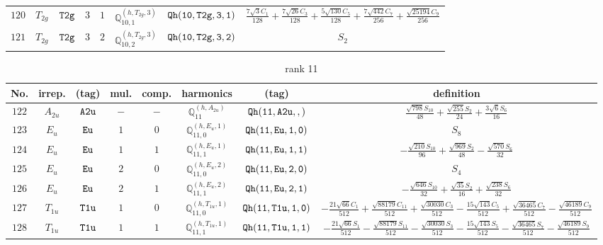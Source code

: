 \documentclass[fleqn,8pt]{jsarticle}
\begin{document}
\begin{table}[ht!]
\begin{center}
\begin{tabular}{cccccccc}
$ 120 $ & $ T_{2g} $ & $ {\tt T2g} $ & $ 3 $ & $ 1 $ & $ \mathbb{Q}_{10,1}^{(h,T_{2g},3)} $ & $ {\tt Qh(10,T2g,3,1)} $ & $ \frac{7 \sqrt{3} C_{1}}{128} + \frac{7 \sqrt{26} C_{3}}{128} + \frac{5 \sqrt{130} C_{5}}{128} + \frac{7 \sqrt{442} C_{7}}{256} + \frac{\sqrt{25194} C_{9}}{256} $ \\
$ 121 $ & $ T_{2g} $ & $ {\tt T2g} $ & $ 3 $ & $ 2 $ & $ \mathbb{Q}_{10,2}^{(h,T_{2g},3)} $ & $ {\tt Qh(10,T2g,3,2)} $ & $ S_{2} $ \\
 \hline \hline
\end{tabular}
\end{center}
\end{table}
\begin{table}[ht!]
\begin{center}
\caption{rank 11}
\renewcommand{\arraystretch}{1.3}
\begin{tabular}{cccccccc} \hline \hline
No. & irrep. & (tag) & mul. & comp. & harmonics & (tag) & definition \\ \hline
$ 122 $ & $ A_{2u} $ & $ {\tt A2u} $ & $ - $ & $ - $ & $ \mathbb{Q}_{11}^{(h,A_{2u})} $ & $ {\tt Qh(11,A2u,,)} $ & $ \frac{\sqrt{798} S_{10}}{48} + \frac{\sqrt{255} S_{2}}{24} + \frac{3 \sqrt{6} S_{6}}{16} $ \\
$ 123 $ & $ E_{u} $ & $ {\tt Eu} $ & $ 1 $ & $ 0 $ & $ \mathbb{Q}_{11,0}^{(h,E_{u},1)} $ & $ {\tt Qh(11,Eu,1,0)} $ & $ S_{8} $ \\
$ 124 $ & $ E_{u} $ & $ {\tt Eu} $ & $ 1 $ & $ 1 $ & $ \mathbb{Q}_{11,1}^{(h,E_{u},1)} $ & $ {\tt Qh(11,Eu,1,1)} $ & $ - \frac{\sqrt{210} S_{10}}{96} + \frac{\sqrt{969} S_{2}}{48} - \frac{\sqrt{570} S_{6}}{32} $ \\
$ 125 $ & $ E_{u} $ & $ {\tt Eu} $ & $ 2 $ & $ 0 $ & $ \mathbb{Q}_{11,0}^{(h,E_{u},2)} $ & $ {\tt Qh(11,Eu,2,0)} $ & $ S_{4} $ \\
$ 126 $ & $ E_{u} $ & $ {\tt Eu} $ & $ 2 $ & $ 1 $ & $ \mathbb{Q}_{11,1}^{(h,E_{u},2)} $ & $ {\tt Qh(11,Eu,2,1)} $ & $ - \frac{\sqrt{646} S_{10}}{32} + \frac{\sqrt{35} S_{2}}{16} + \frac{\sqrt{238} S_{6}}{32} $ \\
$ 127 $ & $ T_{1u} $ & $ {\tt T1u} $ & $ 1 $ & $ 0 $ & $ \mathbb{Q}_{11,0}^{(h,T_{1u},1)} $ & $ {\tt Qh(11,T1u,1,0)} $ & $ - \frac{21 \sqrt{66} C_{1}}{512} + \frac{\sqrt{88179} C_{11}}{512} + \frac{\sqrt{30030} C_{3}}{512} - \frac{15 \sqrt{143} C_{5}}{512} + \frac{\sqrt{36465} C_{7}}{512} - \frac{\sqrt{46189} C_{9}}{512} $ \\
$ 128 $ & $ T_{1u} $ & $ {\tt T1u} $ & $ 1 $ & $ 1 $ & $ \mathbb{Q}_{11,1}^{(h,T_{1u},1)} $ & $ {\tt Qh(11,T1u,1,1)} $ & $ - \frac{21 \sqrt{66} S_{1}}{512} - \frac{\sqrt{88179} S_{11}}{512} - \frac{\sqrt{30030} S_{3}}{512} - \frac{15 \sqrt{143} S_{5}}{512} - \frac{\sqrt{36465} S_{7}}{512} - \frac{\sqrt{46189} S_{9}}{512} $ \\

\end{tabular}
\end{center}
\end{table}
\end{document}
